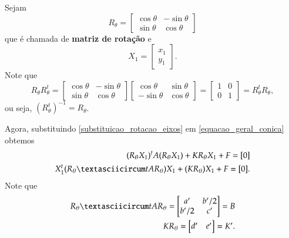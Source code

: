 Sejam
\[
  R_\theta = \begin{bmatrix}
    \cos\theta & -\sin\theta\\
    \sin\theta & \cos\theta
  \end{bmatrix}
\]
que é chamada de \textbf{matriz de rotação} e
\[
  X_1 = \begin{bmatrix}x_1\\y_1\end{bmatrix}.
\]
Note que
\[
  R_\theta R_\theta^t = \begin{bmatrix}
    \cos\theta & -\sin\theta\\
    \sin\theta & \cos\theta
  \end{bmatrix}\begin{bmatrix}
    \cos\theta & \sin\theta\\
    -\sin\theta & \cos\theta
  \end{bmatrix} = \begin{bmatrix}
    1 & 0\\
    0 & 1
  \end{bmatrix} = R_\theta^t R_\theta, 
\]
ou seja, $(R_\theta^t)^{-1} = R_\theta$.

Agora, substituindo \eqref{substituicao_rotacao_eixos} em \eqref{equacao_geral_conica} obtemos
\begin{align*}
  (R_\theta X_1)^t A (R_\theta X_1) + KR_\theta X_1 + F = [0]\\
  X_1^t(R_\thetaˆt A R_\theta)X_1 + (KR_\theta)X_1 + F = [0].
\end{align*}
Note que
\begin{align*}
  R_\thetaˆt A R_\theta = \begin{bmatrix}
    a' & b'/2\\
    b'/2 & c'
  \end{bmatrix} = B\\
  KR_\theta = \begin{bmatrix}
    d'& e'
  \end{bmatrix} = K'.
\end{align*}




